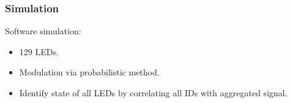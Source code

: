 \documentclass{beamer}
\begin{document}
	\begin{frame}\frametitle{Simulation}
		
		Software simulation:

		\begin{itemize}

			\item 129 LEDs.

			\item Modulation via probabilistic method.




			\item Identify state of all LEDs by correlating all IDs with aggregated signal.
		\end{itemize}

		

	\end{frame}








\end{document}
